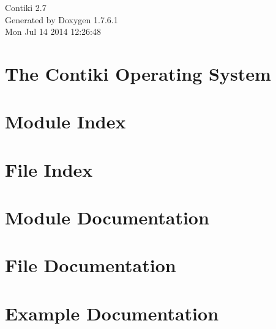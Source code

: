 \documentclass[a4paper]{article}
\begin{document}
\hypersetup{pageanchor=false,citecolor=blue}
\begin{titlepage}
\vspace*{7cm}
\begin{center}
{\Large \-Contiki 2.7 }\\
\vspace*{1cm}
{\large \-Generated by Doxygen 1.7.6.1}\\
\vspace*{0.5cm}
{\small Mon Jul 14 2014 12:26:48}\\
\end{center}
\end{titlepage}
\tableofcontents
{}
\hypersetup{pageanchor=true,citecolor=blue}
\section{\-The \-Contiki \-Operating \-System}
\label{index}\hypertarget{index}{}
\section{\-Module \-Index}

\section{\-File \-Index}

\section{\-Module \-Documentation}





















\section{\-File \-Documentation}

\section{\-Example \-Documentation}


















\printindex
\end{document}
